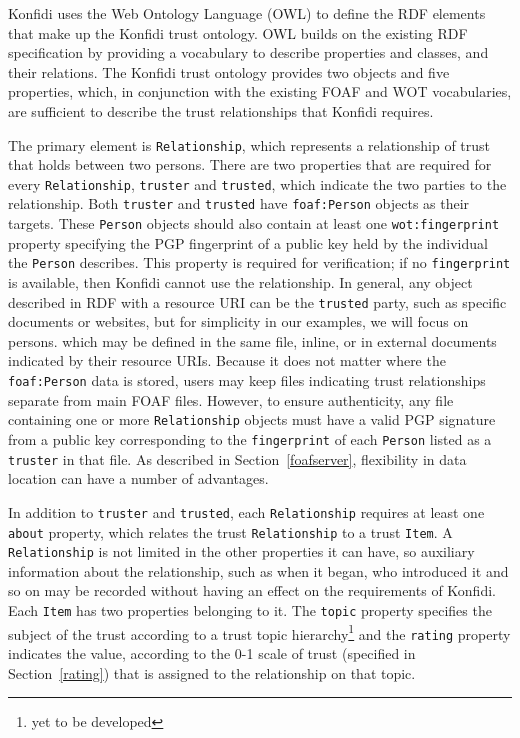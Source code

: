\documentclass{acm_proc_article-sp}
\begin{document}
Konfidi uses the Web Ontology Language (OWL) \citep{owl} to define the RDF elements that make up the Konfidi trust ontology.  OWL builds on the existing RDF specification by providing a vocabulary to describe properties and classes, and their relations.  The Konfidi trust ontology provides two objects and five properties, which, in conjunction with the existing FOAF and WOT vocabularies, are sufficient to describe the trust relationships that Konfidi requires.

The primary element is \texttt{Re\-la\-tion\-ship}, which represents a relationship of trust that holds between two persons.  There are two properties that are required for every \texttt{Re\-la\-tion\-ship}, \texttt{trust\-er} and \texttt{trust\-ed}, which indicate the two parties to the relationship.  Both \texttt{trust\-er} and \texttt{trust\-ed} have \texttt{foaf:\-Per\-son} objects as their targets.  These \texttt{Per\-son} objects should also contain at least one \texttt{wot:\-fin\-ger\-print} property specifying the PGP fingerprint of a public key held by the individual the \texttt{Per\-son} describes.  This property is required for verification; if no \texttt{fin\-ger\-print} is available, then Konfidi cannot use the relationship.  In general, any object described in RDF with a resource URI can be the \texttt{trust\-ed} party, such as specific documents or websites, but for simplicity in our examples, we will focus on persons. which may be defined in the same file, inline, or in external documents indicated by their resource URIs.  Because it does not matter where the \texttt{foaf:\-Per\-son} data is stored, users may keep files indicating trust relationships separate from main FOAF files.  However, to ensure authenticity, any file containing one or more \texttt{Re\-la\-tion\-ship} objects must have a valid PGP signature from a public key corresponding to the \texttt{fin\-ger\-print} of each \texttt{Per\-son} listed as a \texttt{trust\-er} in that file.  As described in Section~\ref{foafserver}, flexibility in data location can have a number of advantages.  

In addition to \texttt{truster} and \texttt{trusted}, each \texttt{Relationship} requires at least one \texttt{about} property, which relates the trust \texttt{Re\-la\-tion\-ship} to a trust \texttt{Item}.  A \texttt{Re\-la\-tion\-ship} is not limited in the other properties it can have, so auxiliary information about the relationship, such as when it began, who introduced it and so on may be recorded without having an effect on the requirements of Konfidi.  Each \texttt{Item} has two properties belonging to it.  The \texttt{topic} property specifies the subject of the trust according to a trust topic hierarchy\footnote{yet to be developed} and the \texttt{rating} property indicates the value, according to the 0-1 scale of trust (specified in Section~\ref{rating}) that is assigned to the relationship on that topic.  
\end{document}
